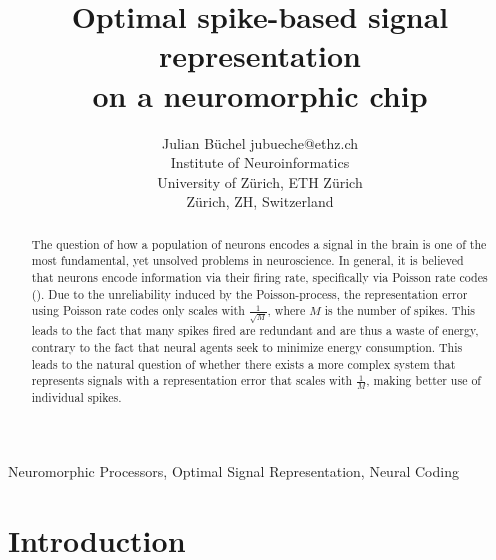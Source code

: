 \documentclass[twoside,11pt]{article}
\begin{document}
\title{Optimal spike-based signal representation\\on a neuromorphic chip}

\author{\name Julian B\"uchel \email jubueche@ethz.ch \\
       \addr Institute of Neuroinformatics\\
       University of Z\"urich, ETH Z\"urich \\
       Z\"urich, ZH, Switzerland}

\editor{}

\maketitle

\tableofcontents
\newpage

\begin{abstract}%
The question of how a population of neurons encodes a signal in the brain is one of the
most fundamental, yet unsolved problems in neuroscience. In general, it is believed that
neurons encode information via their firing rate, specifically via Poisson rate codes (\cite{Maass:2002:RCW:639717.639718}).
Due to the unreliability induced by the Poisson-process, the representation error using Poisson
rate codes only scales with $\frac{1}{\sqrt{M}}$, where $M$ is the number of spikes.
This leads to the fact that many spikes fired are redundant and are thus a waste of energy,
contrary to the fact that neural agents seek to minimize energy consumption. This
leads to the natural question of whether there exists a more complex system that
represents signals with a representation error that scales with $\frac{1}{M}$, making better
use of individual spikes.
  

\end{abstract}

\begin{keywords}
  Neuromorphic Processors, Optimal Signal Representation, Neural Coding
\end{keywords}

\section{Introduction}
\end{document}
